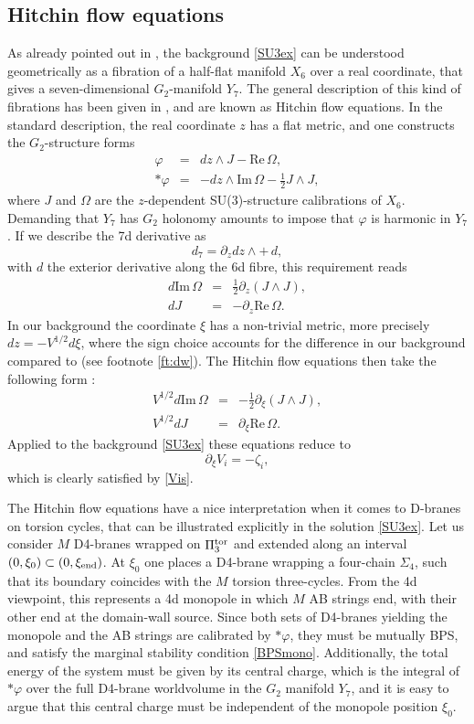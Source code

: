 \documentclass[11pt]{article}
\def\be{\begin{equation}}
\def\ee{\end{equation}}
\def\bea{\begin{eqnarray}}
\def\eea{\end{eqnarray}}
\def\oh{\frac{1}{2}}
\def\re{\mbox{Re}\, }
\def\im{\mbox{Im}\, }
\def\Om{\Omega}
\def\p {{\partial}}
\begin{document}
\subsection{Hitchin flow equations}
\label{ss:hitchin}

As already pointed out in \cite{Gurrieri:2002wz}, the background \eqref{SU3ex} can be understood geometrically as a fibration of a half-flat manifold $X_6$ over a real coordinate, that gives a seven-dimensional $G_2$-manifold $Y_7$. The general description of this kind of fibrations has been given in \cite{hitchin2001stable,chiossi2002intrinsic}, and are known as Hitchin flow equations. In the standard description, the real coordinate $z$ has a flat metric, and one constructs the $G_2$-structure forms
\bea
\varphi & = & dz \wedge J  - {\re \Om} , \\
*\varphi & = & -dz \wedge {\im \Om} - \oh J \wedge J ,
\eea
where $J$ and $\Om$ are the $z$-dependent SU(3)-structure calibrations of $X_6$. Demanding that  $Y_7$ has $G_2$ holonomy amounts to impose that $\varphi$ is harmonic in $Y_7$. If we describe the 7d derivative as 
\be
d_7 = \p_z  dz \wedge  + \, d ,
\ee 
with $d$ the exterior derivative along the 6d fibre, this requirement reads
\bea
\label{dreom}
d {\im \Om} & = & \oh\p_z \left(J \wedge J\right) , \\
d J & = & - \p_z {\re \Om} .
\label{dj}
\eea
 In our background the coordinate $\xi$ has a non-trivial metric, more precisely $dz = - V^{1/2}d\xi$, where the sign choice accounts for the difference in our background compared to \cite{Gurrieri:2002wz} (see footnote \ref{ft:dw}). The Hitchin flow equations then take the following form :
\bea
\label{dreomxi}
V^{1/2} d {\im \Om} & = & - \oh \p_\xi \left(J \wedge J\right) , \\
V^{1/2} d J & = &  \p_\xi {\re \Om} . 
\label{djxi}
\eea
Applied to the background \eqref{SU3ex} these equations reduce to
\be
\p_\xi V_i  =  - \zeta_i ,
\ee
which is clearly satisfied by \eqref{Vis}.


The Hitchin flow equations have a nice interpretation when it comes to D-branes on torsion cycles, that can be illustrated explicitly in the solution \eqref{SU3ex}. Let us consider $M$ D4-branes wrapped on $\Pi_3^{\rm tor}$ and extended along an interval $(0, \xi_0) \subset (0,\xi_{\rm end})$. At $\xi_0$  one places a D4-brane wrapping a four-chain $\Sigma_4$, such that its boundary coincides with the $M$ torsion three-cycles. From the 4d viewpoint, this represents a 4d monopole in which $M$ AB strings end, with their other end at the domain-wall source. Since both sets of D4-branes yielding the monopole and the AB strings are calibrated by $*\varphi$, they must be mutually BPS, and satisfy the marginal stability condition \eqref{BPSmono}. Additionally, the total energy of the system must be given by its central charge, which is the integral of $*\varphi$ over the full D4-brane worldvolume in the $G_2$ manifold $Y_7$, and it is easy to argue that this central charge must be independent of the monopole position $\xi_0$. 
\end{document}
